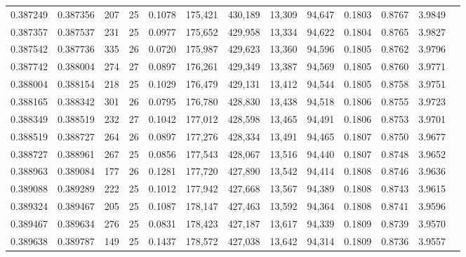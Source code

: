 \begin{tabular}{rrrrrrrrrrrrr}
0.387249 & 0.387356 & 207 &  25 &                                     0.1078 & 175,421 & 430,189 &  13,309 &  94,647 & 0.1803 & 0.8767 & 3.9849 \\
0.387357 & 0.387537 & 231 &  25 &                                     0.0977 & 175,652 & 429,958 &  13,334 &  94,622 & 0.1804 & 0.8765 & 3.9827 \\
0.387542 & 0.387736 & 335 &  26 &                                     0.0720 & 175,987 & 429,623 &  13,360 &  94,596 & 0.1805 & 0.8762 & 3.9796 \\
0.387742 & 0.388004 & 274 &  27 &                                     0.0897 & 176,261 & 429,349 &  13,387 &  94,569 & 0.1805 & 0.8760 & 3.9771 \\
0.388004 & 0.388154 & 218 &  25 &                                     0.1029 & 176,479 & 429,131 &  13,412 &  94,544 & 0.1805 & 0.8758 & 3.9751 \\
0.388165 & 0.388342 & 301 &  26 &                                     0.0795 & 176,780 & 428,830 &  13,438 &  94,518 & 0.1806 & 0.8755 & 3.9723 \\
0.388349 & 0.388519 & 232 &  27 &                                     0.1042 & 177,012 & 428,598 &  13,465 &  94,491 & 0.1806 & 0.8753 & 3.9701 \\
0.388519 & 0.388727 & 264 &  26 &                                     0.0897 & 177,276 & 428,334 &  13,491 &  94,465 & 0.1807 & 0.8750 & 3.9677 \\
0.388727 & 0.388961 & 267 &  25 &                                     0.0856 & 177,543 & 428,067 &  13,516 &  94,440 & 0.1807 & 0.8748 & 3.9652 \\
0.388963 & 0.389084 & 177 &  26 &                                     0.1281 & 177,720 & 427,890 &  13,542 &  94,414 & 0.1808 & 0.8746 & 3.9636 \\
0.389088 & 0.389289 & 222 &  25 &                                     0.1012 & 177,942 & 427,668 &  13,567 &  94,389 & 0.1808 & 0.8743 & 3.9615 \\
0.389324 & 0.389467 & 205 &  25 &                                     0.1087 & 178,147 & 427,463 &  13,592 &  94,364 & 0.1808 & 0.8741 & 3.9596 \\
0.389467 & 0.389634 & 276 &  25 &                                     0.0831 & 178,423 & 427,187 &  13,617 &  94,339 & 0.1809 & 0.8739 & 3.9570 \\
0.389638 & 0.389787 & 149 &  25 &                                     0.1437 & 178,572 & 427,038 &  13,642 &  94,314 & 0.1809 & 0.8736 & 3.9557 \\

\end{tabular}

